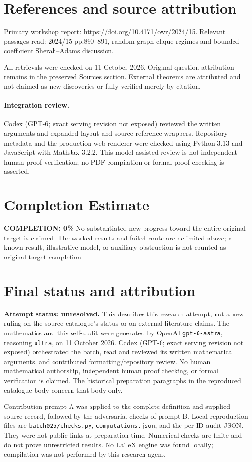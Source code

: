 \documentclass[11pt]{article}
\begin{document}
\section{References and source attribution}
Primary workshop report: \url{https://doi.org/10.4171/owr/2024/15}. Relevant passages read: 2024/15 pp.890--891, random-graph clique regimes and bounded-coefficient Sherali--Adams discussion.

All retrievals were checked on 11 October 2026. Original question attribution remains in the preserved Sources section. External theorems are attributed and not claimed as new discoveries or fully verified merely by citation.


\paragraph{Integration review.} Codex (GPT-6; exact serving revision not exposed) reviewed the written arguments and expanded layout and source-reference wrappers. Repository metadata and the production web renderer were checked using Python 3.13 and JavaScript with MathJax 3.2.2. This model-assisted review is not independent human proof verification; no PDF compilation or formal proof checking is asserted.

\section{Completion Estimate}
\noindent\textbf{COMPLETION: 0\%}
No substantiated new progress toward the entire original target is claimed. The worked results and failed route are delimited above; a known result, illustrative model, or auxiliary obstruction is not counted as original-target completion.

\section{Final status and attribution}
\textbf{Attempt status: unresolved.} This describes this research attempt, not a new ruling on the source catalogue's status or on external literature claims.
The mathematics and this self-audit were generated by OpenAI \texttt{gpt-6-astra}, reasoning \texttt{ultra}, on 11 October 2026. Codex (GPT-6; exact serving revision not exposed) orchestrated the batch, read and reviewed its written mathematical arguments, and contributed formatting/repository review. No human mathematical authorship, independent human proof checking, or formal verification is claimed. The historical preparation paragraphs in the reproduced catalogue body concern that body only.

Contribution prompt A was applied to the complete definition and supplied source record, followed by the adversarial checks of prompt B. Local reproduction files are \texttt{batch025/checks.py}, \texttt{computations.json}, and the per-ID audit JSON. They were not public links at preparation time. Numerical checks are finite and do not prove unrestricted results. No LaTeX engine was found locally; compilation was not performed by this research agent.
\end{document}
